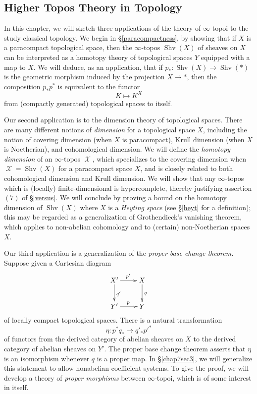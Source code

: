 \documentclass{report}[10pt, final]
\DeclareMathOperator{\Shv}{Shv}
\DeclareMathOperator{\calX}{\mathcal{X}}
\theoremstyle{definition}
\begin{document}
\begin{chapter2onwards}






\chapter{Higher Topos Theory in Topology}\label{chap7}

\setcounter{theorem}{0}
\setcounter{subsection}{0}


In this chapter, we will sketch three applications of the theory of $\infty$-topoi to the study classical topology. We begin in \S \ref{paracompactness}, by showing that if $X$ is a paracompact topological space, then the $\infty$-topos $\Shv(X)$ of sheaves on $X$ can be interpreted as a homotopy theory of topological spaces $Y$ equipped with a map to $X$. We will deduce, as an application, that if $p_{\ast}: \Shv(X) \rightarrow \Shv(\ast)$ is the geometric morphism induced by the projection $X \rightarrow \ast$, then the composition $p_{\ast} p^{\ast}$ is equivalent to the functor $$K \mapsto K^X$$ from (compactly generated) topological spaces to itself.

Our  second application is to the dimension theory of topological spaces. There are many different notions of {\it dimension} for a topological space $X$, including the notion of covering dimension (when $X$ is paracompact), Krull dimension (when $X$ is Noetherian), and cohomological dimension. We will define the {\it homotopy dimension} of an $\infty$-topos $\calX$, which specializes to the covering dimension when $\calX = \Shv(X)$ for a paracompact space $X$, and is closely related to both cohomological dimension and Krull dimension. We will show that any $\infty$-topos which is (locally) finite-dimensional is hypercomplete, thereby justifying assertion $(7)$ of \S \ref{versus}. We will conclude by proving a bound on the homotopy dimension of $\Shv(X)$ where $X$ is a {\it Heyting space} (see \S \ref{heyt} for a definition); this may be regarded as a generalization of Grothendieck's vanishing theorem, which applies to non-abelian cohomology and to (certain) non-Noetherian spaces $X$.

Our third application is a generalization of the {\em proper base change theorem.}
Suppose given a Cartesian diagram
$$ \xymatrix{ X' \ar[r]^{p'} \ar[d]^{q'} & X \ar[d]^{q} \\
Y' \ar[r]^{p} & Y}$$
of locally compact topological spaces.
There is a natural transformation
$$ \eta: p^{\ast} q_{\ast} \rightarrow q'_{\ast} {p'}^{\ast}$$
of functors from the derived category of abelian sheaves on $X$ to the derived category of abelian sheaves on $Y'$. The proper base change theorem asserts that $\eta$ is an isomorphism whenever $q$ is a proper map. In \S \ref{chap7sec3}, we will generalize this statement to allow nonabelian coefficient systems. To give the proof, we will develop a theory of {\it proper morphisms} between $\infty$-topoi, which is of some interest in itself.





\end{chapter2onwards}
\end{document}
